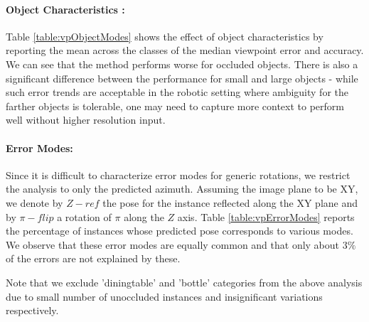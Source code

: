 \paragraph{Object Characteristics : } Table \ref{table:vpObjectModes} shows the effect of object characteristics by reporting the mean across the classes of the median viewpoint error and accuracy. We can see that the method performs worse for occluded objects. There is also a significant difference between the performance for small and large objects - while such error trends are acceptable in the robotic setting where ambiguity for the farther objects is tolerable, one may need to capture more context to perform well without higher resolution input.

\paragraph{Error Modes: }
Since it is difficult to characterize error modes for generic rotations, we restrict the analysis to only the predicted azimuth. Assuming the image plane to be XY, we denote by $Z-ref$ the pose for the instance reflected along the XY plane and by $\pi-flip$ a rotation of $\pi$ along the $Z$ axis. Table \ref{table:vpErrorModes} reports the percentage of instances whose predicted pose corresponds to various modes. We observe that these error modes are equally common  and that only about $3\%$ of the errors are not explained by these.

Note that we exclude 'diningtable' and 'bottle' categories from the above analysis due to small number of unoccluded instances and insignificant variations respectively.